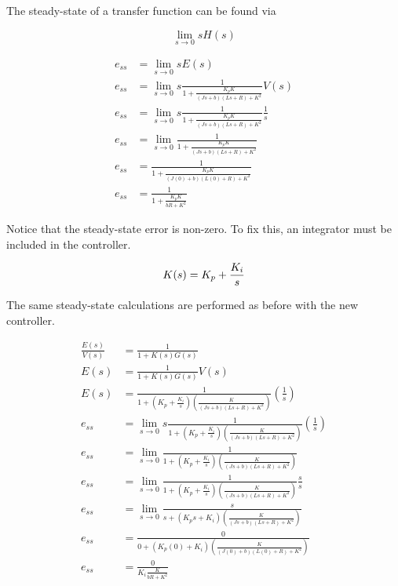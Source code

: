 \documentclass[10pt,conference,compsoc]{IEEEtran}
\begin{document}
The steady-state of a transfer function can be found via

\begin{equation}
  \lim_{s\to0} sH(s)
\end{equation}

\begin{align}
  e_{ss} &= \lim_{s\to0} sE(s) \nonumber \\
  e_{ss} &= \lim_{s\to0} s \frac{1}{1 + \frac{K_p K}{(Js+b)(Ls+R)+K^2}} V(s)
    \nonumber \\
  e_{ss} &= \lim_{s\to0} s \frac{1}{1 + \frac{K_p K}{(Js+b)(Ls+R)+K^2}}
    \frac{1}{s} \nonumber \\
  e_{ss} &= \lim_{s\to0} \frac{1}{1 + \frac{K_p K}{(Js+b)(Ls+R)+K^2}}
    \nonumber \\
  e_{ss} &= \frac{1}{1 + \frac{K_p K}{(J(0)+b)(L(0)+R)+K^2}} \nonumber \\
  e_{ss} &= \frac{1}{1 + \frac{K_p K}{bR+K^2}} \label{eq:ss_nonzero}
\end{align}

Notice that the \gls{steady-state error} is non-zero. To fix this, an integrator
must be included in the controller.

\begin{equation*}
  K(s) = K_p + \frac{K_i}{s} \\
\end{equation*}

The same steady-state calculations are performed as before with the new
controller.

\begin{align*}
  \frac{E(s)}{V(s)} &= \frac{1}{1 + K(s)G(s)} \\
  E(s) &= \frac{1}{1 + K(s)G(s)} V(s) \\
  E(s) &= \frac{1}{1 + \left(K_p + \frac{K_i}{s}\right)
    \left(\frac{K}{(Js+b)(Ls+R)+K^2}\right)} \left(\frac{1}{s}\right) \\
  e_{ss} &= \lim_{s\to0} s \frac{1}{1 + \left(K_p + \frac{K_i}{s}\right)
    \left(\frac{K}{(Js+b)(Ls+R)+K^2}\right)} \left(\frac{1}{s}\right) \\
  e_{ss} &= \lim_{s\to0} \frac{1}{1 + \left(K_p + \frac{K_i}{s}\right)
    \left(\frac{K}{(Js+b)(Ls+R)+K^2}\right)} \\
  e_{ss} &= \lim_{s\to0} \frac{1}{1 + \left(K_p + \frac{K_i}{s}\right)
    \left(\frac{K}{(Js+b)(Ls+R)+K^2}\right)} \frac{s}{s} \\
  e_{ss} &= \lim_{s\to0} \frac{s}{s + \left(K_p s + K_i\right)
    \left(\frac{K}{(Js+b)(Ls+R)+K^2}\right)} \\
  e_{ss} &= \frac{0}{0 + (K_p (0) + K_i)
    \left(\frac{K}{(J(0)+b)(L(0)+R)+K^2}\right)} \\
  e_{ss} &= \frac{0}{K_i \frac{K}{bR+K^2}} \\
\end{align*}
\end{document}

